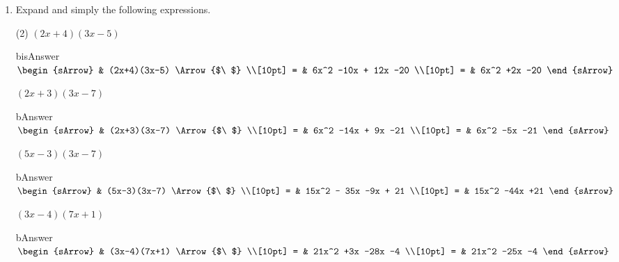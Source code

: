 


	
\begin{enumerate}[resume]
  \item Expand and simply the following expressions.
  \begin{subtask}(2)
    \task[] $(2x+4)(3x-5)$
              \begin{envOut}[equal height group=A-Rev-1]{bisAnswer}
			       $\begin{sArrow}
			             & (2x+4)(3x-5)        \Arrow{$\ $} \\[10pt]
                       = & 6x^2 -10x + 12x -20              \\[10pt]      
					   = & 6x^2 +2x -20 
	                \end{sArrow}$
              \end{envOut}
    \task[] $(2x+3)(3x-7)$
              \begin{envOut}[equal height group=A-Rev-1]{bAnswer}
			       $\begin{sArrow}
			             & (2x+3)(3x-7)        \Arrow{$\ $} \\[10pt]
                       = & 6x^2 -14x + 9x -21               \\[10pt]      
					   = & 6x^2 -5x -21 
	                \end{sArrow}$
              \end{envOut}
    \task[] $(5x-3)(3x-7)$
              \begin{envOut}[equal height group=A-Rev-1]{bAnswer}
			       $\begin{sArrow}
			             & (5x-3)(3x-7)        \Arrow{$\ $} \\[10pt]
                       = & 15x^2 - 35x -9x + 21             \\[10pt]      
					   = & 15x^2 -44x +21
	                \end{sArrow}$
              \end{envOut}
    \task[] $(3x-4)(7x+1)$
              \begin{envOut}[equal height group=A-Rev-1]{bAnswer}
			       $\begin{sArrow}
			             & (3x-4)(7x+1)        \Arrow{$\ $} \\[10pt]
                       = & 21x^2 +3x -28x -4                \\[10pt]      
					   = & 21x^2 -25x -4
	                \end{sArrow}$
              \end{envOut}
  \end{subtask}
\end{enumerate}

